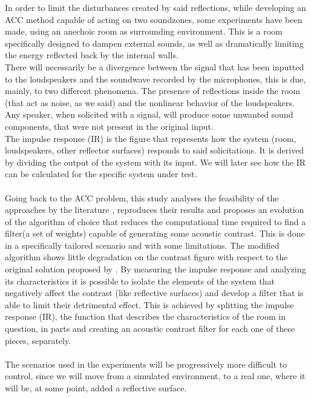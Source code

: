 In order to limit the disturbances created by said reflections, while developing an ACC method capable of acting on two soundzones, some experiments have been made, using an anechoic room as surrounding environment. This is a room specifically designed to dampen external sounds, as well as dramatically limiting the energy reflected back by the internal walls.
\\
There will necessarily be a divergence between the signal that has been inputted to the loudspeakers and the soundwave recorded by the microphones, this is due, mainly, to two different phenomena. The presence of reflections inside the room (that act as noise, as we said) and the nonlinear behavior of the loudspeakers. Any speaker, when solicited with a signal, will produce some unwanted sound components, that were not present in the original input.
\\
The impulse response (IR) is the figure that represents how the system (room, loudspeakers, other reflector surfaces) responds to said solicitations. It is derived by dividing the output of the system with its input. We will later see how the IR can be calculated for the specific system under test.
\\
\\
Going back to the ACC problem, this study analyses the feasibility of the approaches by the literature \parencite{cai_time-domain_2014,choi_generation_2002}, reproduces their results and proposes an evolution of the algorithm of choice that reduces the computational time required to find a filter(a set of weights) capable of generating some acoustic contrast. This is done in a specifically tailored scenario and with some limitations. The modified algorithm shows little degradation on the contrast figure with respect to the original solution proposed by \parencite{cai_time-domain_2014}. By measuring the impulse response and analyzing its characteristics it is possible to isolate the elements of the system that negatively affect the contrast (like reflective surfaces) and develop a filter that is able to limit their detrimental effect. This is achieved by splitting the impulse response (IR), the function that describes the characteristics of the room in question, in parts and creating an acoustic contrast filter for each one of these pieces, separately.
\\
\\
The scenarios used in the experiments will be progressively more difficult to control, since we will move from a simulated environment, to a real one, where it will be, at some point, added a reflective surface.
